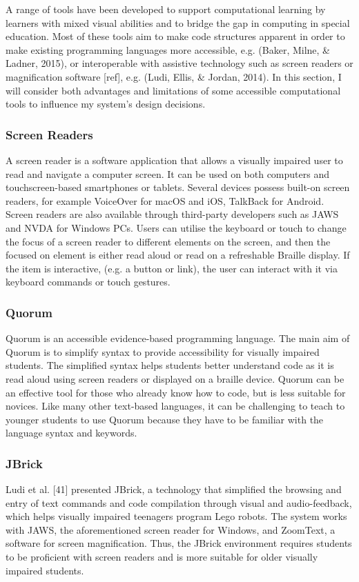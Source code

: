 \documentclass[oneside,%
                    author={Malak Hajji},
                    degree={BSc},
                    title={Designing An Accessible Computational Toolkit For Students},
                  subtitle={With Mixed Visual Abilities}]{dissertation}
\begin{document}
A range of tools have been developed to support computational learning by learners with mixed visual abilities and to bridge the gap in computing in special education. Most of these tools aim to make code structures apparent in order to make existing programming languages more accessible, e.g. (Baker, Milne, & Ladner, 2015), or interoperable with assistive technology such as screen readers or magnification software [ref], e.g. (Ludi, Ellis, & Jordan, 2014). In this section, I will consider both advantages and limitations of some accessible computational tools to influence my system’s design decisions. 


\subsubsection{Screen Readers}
A screen reader is a software application that allows a visually impaired user to read and navigate a computer screen. It can be used on both computers and touchscreen-based smartphones or tablets. Several devices possess built-on screen readers, for example VoiceOver for macOS and iOS, TalkBack for Android. Screen readers are also available through third-party developers such as JAWS and NVDA for Windows PCs. 
Users can utilise the keyboard or touch to change the focus of a screen reader to different elements on the screen, and then the focused on element is either read aloud or read on a refreshable Braille display. If the item is interactive, (e.g. a button or link), the user can interact with it via keyboard commands or touch gestures.

\subsubsection{Quorum}
Quorum is an accessible evidence-based programming language. The main aim of Quorum is to simplify syntax to provide accessibility for visually impaired students. The simplified syntax helps students better understand code as it is read aloud using screen readers or displayed on a braille device. Quorum can be an effective tool for those who already know how to code, but is less suitable for novices. Like many other text-based languages, it can be challenging to teach to younger students to use Quorum because they have to be familiar with the language syntax and keywords.

\subsubsection{JBrick}
Ludi et al. [41] presented JBrick, a technology that simplified the browsing and entry of text commands and code compilation through visual and audio-feedback, which helps visually impaired teenagers program Lego robots. The system works with JAWS, the aforementioned screen reader for Windows, and ZoomText, a software for screen magnification. Thus, the JBrick environment requires students to be proficient with screen readers and is more suitable for older visually impaired students.
\end{document}
